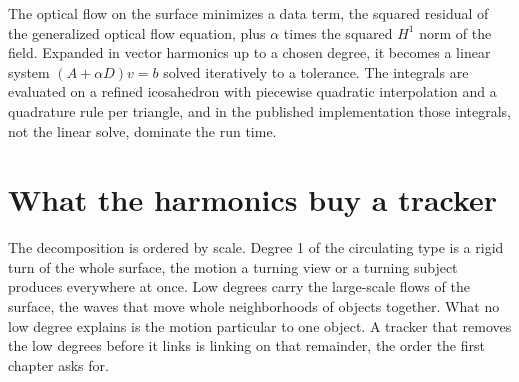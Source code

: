 The optical flow on the surface minimizes a data term, the squared residual of the generalized
optical flow equation, plus \(\alpha\) times the squared \(H^1\) norm of the field. Expanded in vector
harmonics up to a chosen degree, it becomes a linear system \((A + \alpha D)v = b\) solved iteratively
to a tolerance. The integrals are evaluated on a refined icosahedron with piecewise quadratic
interpolation and a quadrature rule per triangle, and in the published implementation those
integrals, not the linear solve, dominate the run time.

\section{What the harmonics buy a tracker}

The decomposition is ordered by scale. Degree 1 of the circulating type is a rigid turn of the whole
surface, the motion a turning view or a turning subject produces everywhere at once. Low degrees
carry the large-scale flows of the surface, the waves that move whole neighborhoods of objects
together. What no low degree explains is the motion particular to one object. A tracker that removes
the low degrees before it links is linking on that remainder, the order the first chapter
asks for.
